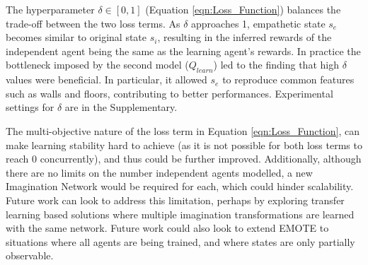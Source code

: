The hyperparameter $\delta \in [0,1]$ (Equation \ref{eqn:Loss_Function}) balances the trade-off between the two loss terms. As $\delta$ approaches 1, empathetic state $s_{e}$ becomes similar to original state $s_{i}$, resulting in the inferred rewards of the independent agent being the same as the learning agent's rewards. In practice the bottleneck imposed by the second model ($Q_{learn}$) led to the finding that high $\delta$ values 
were beneficial. In particular, it allowed $s_e$ to reproduce common features such as walls and floors, contributing to better performances. Experimental settings for $\delta$ are in the Supplementary.

The multi-objective nature of the loss term in Equation \ref{eqn:Loss_Function}, can make learning stability hard to achieve (as it is not possible for both loss terms to reach 0 concurrently), and thus could be further improved. Additionally, although there are no limits on the number independent agents modelled, a new Imagination Network would be required for each, which could hinder scalability. Future work can look to address this limitation, perhaps by exploring transfer learning based solutions where multiple imagination transformations are learned with the same network. %
Future work could also look to extend EMOTE to situations where all agents are being trained, and where states are only partially observable. 

